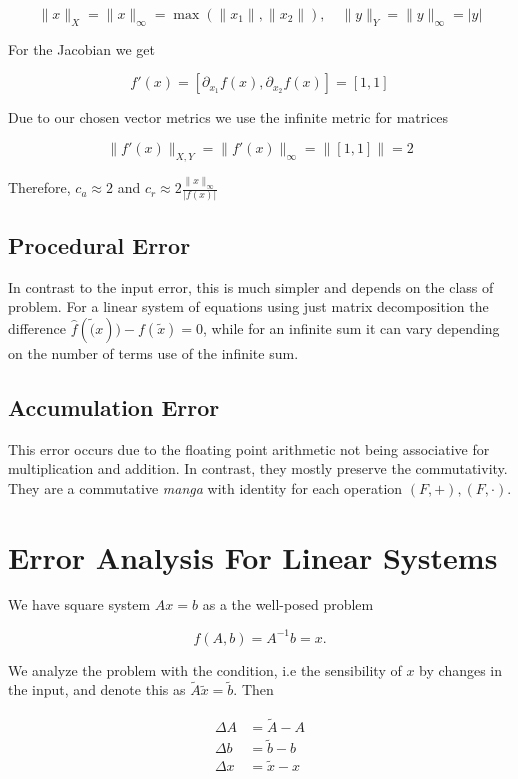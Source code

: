\[
    \|x\|_X = \|x\|_{\infty} = \max(\|x_1\|, \|x_2\|), \quad \|y\|_Y = \|y\|_{\infty} = |y|
\]

For the Jacobian we get 

\[
    f'(x) = [\partial_{x_1} f(x), \partial_{x_2} f(x)] = [1, 1]
\]

Due to our chosen vector metrics we use the infinite metric for matrices 

\[
    \|f'(x)\|_{X,Y} = \|f'(x)\|_{\infty} = \|[1, 1]\| = 2
\]

Therefore, \(c_a \approx 2\) and \(c_r \approx 2 \frac{\|x\|_{\infty}}{|f(x)|}\)

\subsection{Procedural Error}

In contrast to the input error, this is much simpler and depends on the class of problem. For a linear system 
of equations using just matrix decomposition the difference \(\hat{f}(\tilde(x)) - f(\tilde{x}) = 0\), while for 
an infinite sum it can vary depending on the number of terms use of the infinite sum.

\subsection{Accumulation Error}

This error occurs due to the floating point arithmetic not being associative for multiplication and addition. In contrast, 
they mostly preserve the commutativity. They are a commutative \emph{manga} with identity for each operation \((F, +), (F, \cdot)\).


\section{Error Analysis For Linear Systems}

We have square system \(Ax = b\) as a the well-posed problem 

\[
    f(A, b) = A^{-1} b = x.
\]

We analyze the problem with the condition, i.e the sensibility of \(x\) by changes in the input, and denote 
this as \(\tilde{A}\tilde{x} = \tilde{b}\). Then 

\begin{align*}
    \Delta A &= \tilde{A} - A \\
    \Delta b &= \tilde{b} - b \\
    \Delta x &= \tilde{x} - x 
\end{align*}

